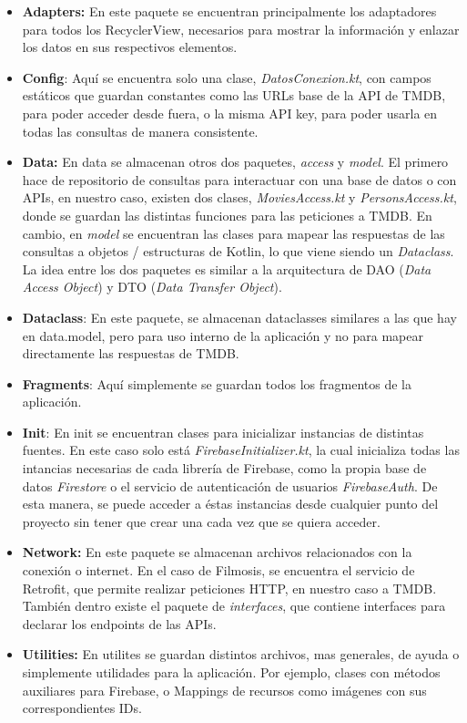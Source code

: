 \documentclass{article}
\begin{document}
    \begin{itemize}
        \item \textbf{Adapters:} En este paquete se encuentran principalmente los adaptadores para todos los RecyclerView, necesarios para mostrar la información y enlazar los datos en sus respectivos elementos.
        \item \textbf{Config}: Aquí se encuentra solo una clase, \textit{DatosConexion.kt}, con campos estáticos que guardan constantes como las URLs base de la API de TMDB, para poder acceder desde fuera, o la misma API key, para poder usarla en todas las consultas de manera consistente.
        \item  \textbf{Data:} En data se almacenan otros dos paquetes, \textit{access} y \textit{model}. El primero hace de repositorio de consultas para interactuar con una base de datos o con APIs, en nuestro caso, existen dos clases, \textit{MoviesAccess.kt} y \textit{PersonsAccess.kt}, donde se guardan las distintas funciones para las peticiones a TMDB. En cambio, en \textit{model} se encuentran las clases para mapear las respuestas de las consultas a objetos / estructuras de Kotlin, lo que viene siendo un \textit{Dataclass}. La idea entre los dos paquetes es similar a la arquitectura de DAO (\textit{Data Access Object}) y DTO (\textit{Data Transfer Object}).
        \item \textbf{Dataclass}: En este paquete, se almacenan dataclasses similares a las que hay en data.model, pero para uso interno de la aplicación y no para mapear directamente las respuestas de TMDB.
        \item \textbf{Fragments}: Aquí simplemente se guardan todos los fragmentos de la aplicación.
        \item \textbf{Init}: En init se encuentran clases para inicializar instancias de distintas fuentes. En este caso solo está \textit{FirebaseInitializer.kt}, la cual inicializa todas las intancias necesarias de cada librería de Firebase, como la propia base de datos \textit{Firestore} o el servicio de autenticación de usuarios \textit{FirebaseAuth}. De esta manera, se puede acceder a éstas instancias desde cualquier punto del proyecto sin tener que crear una cada vez que se quiera acceder.
        \item \textbf{Network:} En este paquete se almacenan archivos relacionados con la conexión o internet. En el caso de Filmosis, se encuentra el servicio de Retrofit, que permite realizar peticiones HTTP, en nuestro caso a TMDB. También dentro existe el paquete de \textit{interfaces}, que contiene interfaces para declarar los endpoints de las APIs.
        \item \textbf{Utilities:} En utilites se guardan distintos archivos, mas generales, de ayuda o simplemente utilidades para la aplicación. Por ejemplo, clases con métodos auxiliares para Firebase, o Mappings de recursos como imágenes con sus correspondientes IDs.
    \end{itemize}
    
\end{document}
